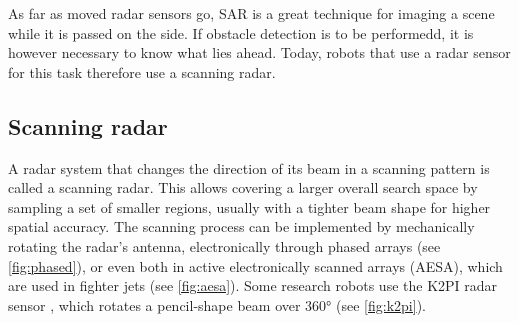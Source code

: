 As far as moved radar sensors go, SAR is a great technique for imaging a scene while it is passed on the side. If obstacle detection is to be performedd, it is however necessary to know what lies ahead. Today, robots that use a radar sensor for this task therefore use a scanning radar.

\subsection{Scanning radar}\label{scanning-radar}

A radar system that changes the direction of its beam in a scanning pattern is called a scanning radar. This allows covering a larger overall search space by sampling a set of smaller regions, usually with a tighter beam shape for higher spatial accuracy. The scanning process can be implemented by mechanically rotating the radar's antenna, electronically through phased arrays (see \cref{fig:phased}), or even both in active electronically scanned arrays (AESA), which are used in fighter jets (see \cref{fig:aesa}). Some research robots use the K2PI radar sensor \cite{Rouveure2008}, which rotates a pencil-shape beam over 360° (see \cref{fig:k2pi}).

